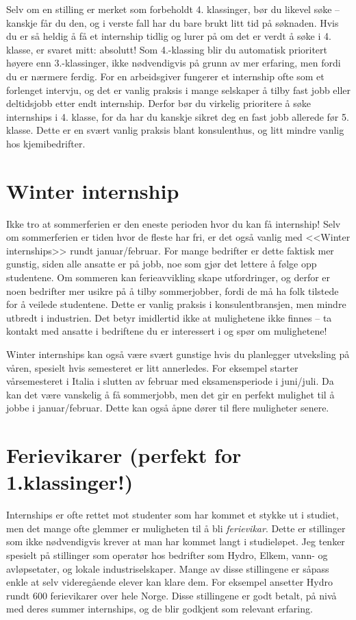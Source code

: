 Selv om en stilling er merket som forbeholdt 4. klassinger, bør du likevel søke – kanskje får du den, og i verste fall har du bare brukt litt tid på søknaden. Hvis du er så heldig å få et internship tidlig og lurer på om det er verdt å søke i 4. klasse, er svaret mitt: absolutt! Som 4.-klassing blir du automatisk prioritert høyere enn 3.-klassinger, ikke nødvendigvis på grunn av mer erfaring, men fordi du er nærmere ferdig. For en arbeidsgiver fungerer et internship ofte som et forlenget intervju, og det er vanlig praksis i mange selskaper å tilby fast jobb eller deltidsjobb etter endt internship. Derfor bør du virkelig prioritere å søke internships i 4. klasse, for da har du kanskje sikret deg en fast jobb allerede før 5. klasse. Dette er en svært vanlig praksis blant konsulenthus, og litt mindre vanlig hos kjemibedrifter.




\section{Winter internship}

Ikke tro at sommerferien er den eneste perioden hvor du kan få internship! Selv om sommerferien er tiden hvor de fleste har fri, er det også vanlig med <<Winter internships>> rundt januar/februar. For mange bedrifter er dette faktisk mer gunstig, siden alle ansatte er på jobb, noe som gjør det lettere å følge opp studentene. Om sommeren kan ferieavvikling skape utfordringer, og derfor er noen bedrifter mer usikre på å tilby sommerjobber, fordi de må ha folk tilstede for å veilede studentene. Dette er vanlig praksis i konsulentbransjen, men mindre utbredt i industrien. Det betyr imidlertid ikke at mulighetene ikke finnes – ta kontakt med ansatte i bedriftene du er interessert i og spør om mulighetene!

Winter internships kan også være svært gunstige hvis du planlegger utveksling på våren, spesielt hvis semesteret er litt annerledes. For eksempel starter vårsemesteret i Italia i slutten av februar med eksamensperiode i juni/juli. Da kan det være vanskelig å få sommerjobb, men det gir en perfekt mulighet til å jobbe i januar/februar. Dette kan også åpne dører til flere muligheter senere. 


\section{Ferievikarer (perfekt for 1.klassinger!)}

Internships er ofte rettet mot studenter som har kommet et stykke ut i studiet, men det mange ofte glemmer er muligheten til å bli \textit{ferievikar}. Dette er stillinger som ikke nødvendigvis krever at man har kommet langt i studieløpet. Jeg tenker spesielt på stillinger som operatør hos bedrifter som Hydro, Elkem, vann- og avløpsetater, og lokale industriselskaper. Mange av disse stillingene er såpass enkle at selv videregående elever kan klare dem. For eksempel ansetter Hydro rundt 600 ferievikarer over hele Norge. Disse stillingene er godt betalt, på nivå med deres summer internships, og de blir godkjent som relevant erfaring.

